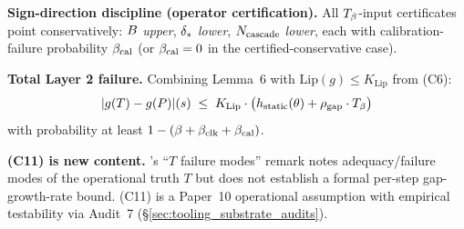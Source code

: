 \textbf{Sign-direction discipline (operator certification).}  All
$T_{\beta}$-input certificates point conservatively: $B$
\emph{upper}, $\delta_{*}$ \emph{lower}, $N_{\mathrm{cascade}}$ \emph{lower},
each with calibration-failure probability $\beta_{\mathrm{cal}}$ (or $\beta_{\mathrm{cal}} = 0$
in the certified-conservative case).

\textbf{Total Layer 2 failure.}  Combining Lemma~6 with
$\mathrm{Lip}(g) \leq K_{\mathrm{Lip}}$ from (C6):
\[
  |g(T) - g(P)|(s) \;\leq\; K_{\mathrm{Lip}} \cdot
  \bigl(h_{\mathrm{static}}(\theta) + \rho_{\mathrm{gap}} \cdot
  T_{\beta}\bigr)
\]
with probability at least $1 - (\beta + \beta_{\mathrm{clk}} + \beta_{\mathrm{cal}})$.

\textbf{(C11) is new content.}
\citep[Microfoundation]{lasser2026micro}'s ``$T$ failure modes''
remark notes adequacy/failure modes of the operational truth $T$
but does not establish a formal per-step gap-growth-rate bound.
(C11) is a Paper~10 operational assumption with empirical
testability via Audit~7 (\S\ref{sec:tooling_substrate_audits}).

